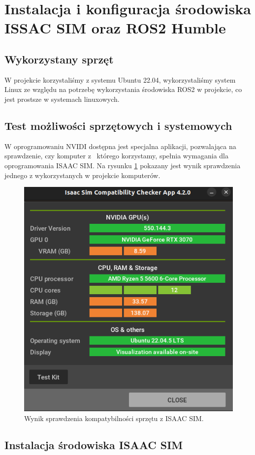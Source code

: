 \documentclass[12pt]{article}
\begin{document}
\clearpage

\section{Instalacja i konfiguracja środowiska ISSAC SIM oraz ROS2 Humble}

\subsection{Wykorzystany sprzęt}

W projekcie korzystaliśmy z systemu Ubuntu 22.04, wykorzystaliśmy system Linux ze względu na potrzebę wykorzystania środowiska ROS2 w projekcie, co jest prostsze w systemach linuxowych.   

\subsection{Test możliwości sprzętowych i systemowych}

W oprogramowaniu NVIDI dostępna jest specjalna aplikacji, pozwalająca na sprawdzenie, czy komputer z~ którego korzystamy, spełnia wymagania dla oprogramowania ISAAC SIM. Na rysunku \ref{sprzetSprawdz} pokazany jest wynik sprawdzenia jednego z wykorzystanych w projekcie komputerów.

\begin{figure}[h]
    \centering
    \includegraphics[width=0.5\linewidth]{Zdjęcia/sprawdzeniSprzetu.png}
    \caption{Wynik sprawdzenia kompatybilności sprzętu z ISAAC SIM.}
    \label{sprzetSprawdz}
\end{figure}

\subsection{Instalacja środowiska ISAAC SIM}
\end{document}
